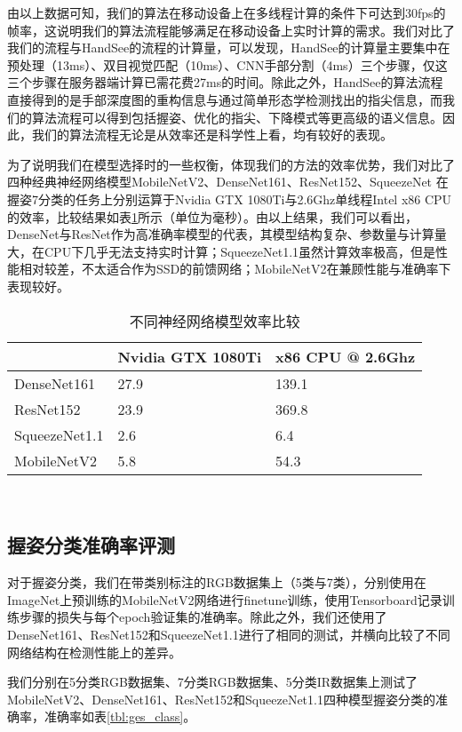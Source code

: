 由以上数据可知，我们的算法在移动设备上在多线程计算的条件下可达到30fps的帧率，这说明我们的算法流程能够满足在移动设备上实时计算的需求。我们对比了我们的流程与HandSee的流程的计算量，可以发现，HandSee的计算量主要集中在预处理（13ms）、双目视觉匹配（10ms）、CNN手部分割（4ms）三个步骤，仅这三个步骤在服务器端计算已需花费27ms的时间。除此之外，HandSee的算法流程直接得到的是手部深度图的重构信息与通过简单形态学检测找出的指尖信息，而我们的算法流程可以得到包括握姿、优化的指尖、下降模式等更高级的语义信息。因此，我们的算法流程无论是从效率还是科学性上看，均有较好的表现。

为了说明我们在模型选择时的一些权衡，体现我们的方法的效率优势，我们对比了四种经典神经网络模型MobileNetV2、DenseNet161、ResNet152、SqueezeNet 在握姿7分类的任务上分别运算于Nvidia GTX 1080Ti与2.6Ghz单线程Intel x86 CPU的效率，比较结果如表\ref{tbl:nn_speed}所示（单位为毫秒）。由以上结果，我们可以看出，DenseNet与ResNet作为高准确率模型的代表，其模型结构复杂、参数量与计算量大，在CPU下几乎无法支持实时计算；SqueezeNet1.1虽然计算效率极高，但是性能相对较差，不太适合作为SSD的前馈网络；MobileNetV2在兼顾性能与准确率下表现较好。

\begin{table}[htbp]
\centering
\caption{不同神经网络模型效率比较}
\label{tbl:nn_speed}
\begin{tabular}{p{80 pt}p{100 pt}p{100 pt}}
 \toprule
   & Nvidia GTX 1080Ti & x86 CPU @ 2.6Ghz\\
 \midrule
    DenseNet161 & 27.9 & 139.1 \\
    ResNet152 & 23.9 & 369.8 \\
    SqueezeNet1.1 & 2.6 & 6.4 \\
    MobileNetV2 & 5.8 & 54.3 \\
\bottomrule
 \end{tabular}\\[2pt]
\end{table}

\subsection{握姿分类准确率评测}

对于握姿分类，我们在带类别标注的RGB数据集上（5类与7类），分别使用在ImageNet上预训练的MobileNetV2网络进行finetune训练，使用Tensorboard记录训练步骤的损失与每个epoch验证集的准确率。除此之外，我们还使用了DenseNet161、ResNet152和SqueezeNet1.1进行了相同的测试，并横向比较了不同网络结构在检测性能上的差异。

我们分别在5分类RGB数据集、7分类RGB数据集、5分类IR数据集上测试了MobileNetV2、DenseNet161、ResNet152和SqueezeNet1.1四种模型握姿分类的准确率，准确率如表\ref{tbl:ges_class}。

